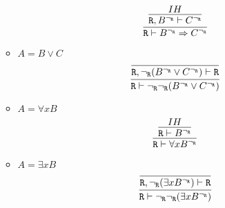 \begin{enumerate}[(i)]
\begin{itemize}
            $$
                \infer{
                    \R \vdash B^\ngr \Rightarrow C^\ngr
                }{
                    \infer{
                        \R, B^\ngr \vdash C^\ngr
                    }{
                        IH
                    }
                }
            $$
        \item $A=B \vee C$
            $$
                \infer{
                    \R \vdash \ngr\ngr(B^\ngr \vee C^\ngr)
                }{
                    \infer{
                        \R, \ngr(B^\ngr \vee C^\ngr) \vdash \R
                    }{
                    }
                }
            $$
        \item $A=\forall x B$
            $$
                \infer{
                    \R \vdash \forall x B^\ngr
                }{
                    \infer{
                        \R \vdash B^\ngr
                    }{
                        IH
                    }
                }
            $$
        \item $A=\exists x B$
            $$
                \infer{
                    \R \vdash \ngr\ngr(\exists x B^\ngr)
                }{
                    \infer{
                        \R, \ngr(\exists x B^\ngr) \vdash \R
                    }{
                    }
                }
            $$
    \end{itemize}


\end{enumerate}
